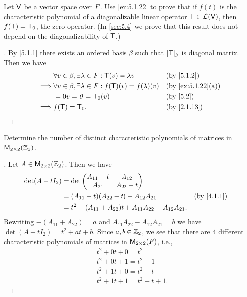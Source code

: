 \begin{ex}\label{ex:5.1.23}
  Let \(\mathsf{V}\) be a vector space over \(\mathit{F}\).
  Use \cref{ex:5.1.22} to prove that if \(f(t)\) is the characteristic polynomial of a diagonalizable linear operator \(\mathsf{T} \in \mathcal{L}(\mathsf{V})\), then \(f(\mathsf{T}) = \mathsf{T}_0\), the zero operator.
  (In \cref{sec:5.4} we prove that this result does not depend on the diagonalizability of \(\mathsf{T}\).)
\end{ex}

\begin{proof}[]
  By \cref{5.1.1} there exists an ordered basis \(\beta\) such that \([\mathsf{T}]_{\beta}\) is diagonal matrix.
  Then we have
  \begin{align*}
             & \forall v \in \beta, \exists \lambda \in \F : \T(v) = \lambda v        &  & \text{(by \cref{5.1.2})}        \\
    \implies & \forall v \in \beta, \exists \lambda \in \F : f(\T)(v) = f(\lambda)(v) &  & \text{(by \cref{ex:5.1.22}(a))} \\
             & = 0v = \zv = \zT(v)                                                    &  & \text{(by \cref{5.2})}          \\
    \implies & f(\T) = \zT.                                                           &  & \text{(by \cref{2.1.13})}
  \end{align*}
\end{proof}

\setcounter{ex}{25}
\begin{ex}\label{ex:5.1.26}
  Determine the number of distinct characteristic polynomials of matrices in \(\mathsf{M}_{{2} \times 2}({\mathbb{Z}_2})\).
\end{ex}

\begin{proof}[]
  Let \(A \in \mathsf{M}_{{2} \times 2}({\mathbb{Z}_2})\).
  Then we have
  \begin{align*}
    \det(A - t I_2) & = \det\begin{pmatrix}
                              A_{1 1} - t & A_{1 2}     \\
                              A_{2 1}     & A_{2 2} - t
                            \end{pmatrix}                                                                  \\
                    & = (A_{1 1} - t) (A_{2 2} - t) - A_{1 2} A_{2 1}                    &  & \text{(by \cref{4.1.1})} \\
                    & = t^2 - (A_{1 1} + A_{2 2}) t + A_{1 1} A_{2 2} - A_{1 2} A_{2 1}.
  \end{align*}
  Rewriting \(-(A_{1 1} + A_{2 2}) = a\) and \(A_{1 1} A_{2 2} - A_{1 2} A_{2 1} = b\) we have \(\det(A - t I_2) = t^2 + at + b\).
  Since \(a, b \in \mathbb{Z}_2\), we see that there are \(4\) different characteristic polynomials of matrices in \(\mathsf{M}_{{2} \times 2}({\mathit{F}})\), i.e.,
  \begin{align*}
     & t^2 + 0t + 0 = t^2          \\
     & t^2 + 0t + 1 = t^2 + 1      \\
     & t^2 + 1t + 0 = t^2 + t      \\
     & t^2 + 1t + 1 = t^2 + t + 1.
  \end{align*}
\end{proof}
